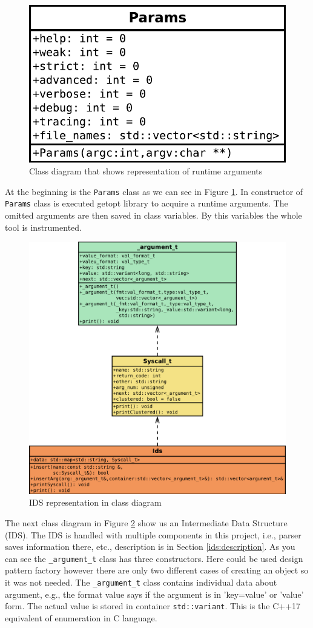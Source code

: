 \begin{figure}[h]
	\centering
	\includegraphics[width=0.5\linewidth]{obrazky-figures/class/params.pdf}
	\caption{Class diagram that shows representation of runtime arguments}
	\label{fig:class:params}
\end{figure}

At the beginning is the \texttt{Params} class as we can see in Figure
\ref{fig:class:params}. In constructor of \texttt{Params} class is executed
getopt library to acquire a runtime arguments. The omitted arguments are then
saved in class variables. By this variables the whole tool is instrumented.

\begin{figure}[h]
	\centering
	\includegraphics[width=0.8\linewidth]{obrazky-figures/class/arg_sc.pdf}
	\caption{IDS representation in class diagram}
	\label{fig:class:ids}
\end{figure}
\pagebreak

The next class diagram in Figure \ref{fig:class:ids} show us an Intermediate
Data Structure (IDS). The IDS is handled with multiple components in this
project, i.e., parser saves information there, etc., description is in Section
\ref{ids:description}. As you can see the \texttt{\_argument\_t} class has three
constructors.  Here could be used design pattern factory however there are only
two different cases of creating an object so it was not needed. The
\texttt{\_argument\_t} class contains individual data about argument, e.g., the
format value says if the argument is in 'key=value' or 'value' form. The actual
value is stored in container \texttt{std::variant}. This is the C++17 equivalent
of enumeration in C language.

